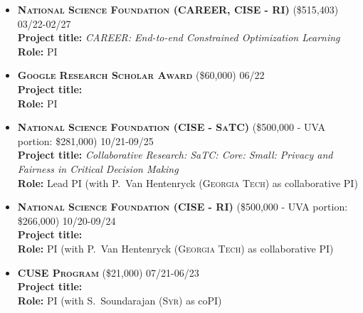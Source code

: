 \begin{itemize}
	\item
	\textbf{\textsc{National Science Foundation (CAREER, CISE - RI)}}
	(\$515,403)
	\hfill\textsc{03/22-02/27}\\
	{\bf Project title:} 
	{\em CAREER: End-to-end Constrained Optimization Learning}\\
	{\bf Role:} PI

	\item
	\textbf{\textsc{Google Research Scholar Award}}
	(\$60,000)
	\hfill\textsc{06/22}\\
	{\bf Project title:} \\
	{\bf Role:} PI

	\item
	\textbf{\textsc{National Science Foundation (CISE - SaTC)}}
	(\$500,000 - UVA portion: \$281,000)
	\hfill\textsc{10/21-09/25}\\
	{\bf Project title:} 
	{\em Collaborative Research: SaTC: Core: Small: Privacy and Fairness in Critical Decision Making}\\
	{\bf Role:} Lead PI (with P.~Van Hentenryck (\textsc{Georgia Tech}) as collaborative PI)

	\item
	\textbf{\textsc{National Science Foundation (CISE - RI)}}
	(\$500,000 - UVA portion: \$266,000)
	\hfill\textsc{10/20-09/24}\\
	{\bf Project title:} 
	\\
	{\bf Role:} PI (with P.~Van Hentenryck (\textsc{Georgia Tech}) as collaborative PI)

	\item
	\textbf{\textsc{CUSE Program}}
	(\$21,000)
	\hfill\textsc{07/21-06/23}\\
	{\bf Project title:} \\
	{\bf Role:} PI (with S.~Soundarajan (\textsc{Syr}) as coPI)	
\end{itemize}


